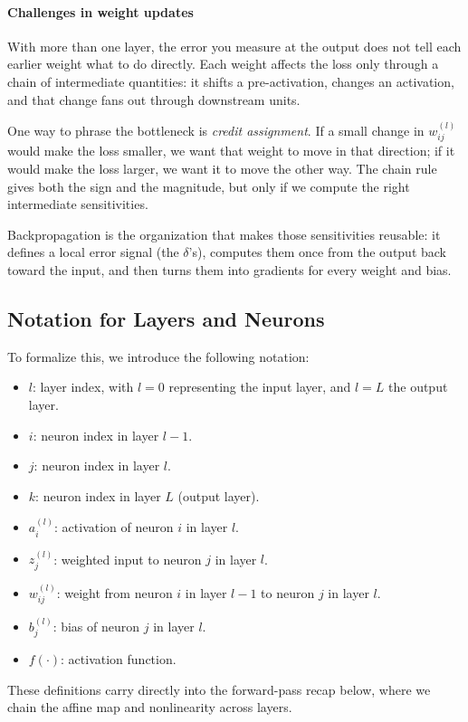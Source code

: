 \paragraph{Challenges in weight updates}
\label{sec:backprop_challenges_in_weight_updates}

With more than one layer, the error you measure at the output does not tell each earlier weight what to do directly. Each weight affects the loss only through a chain of intermediate quantities: it shifts a pre\hyp{}activation, changes an activation, and that change fans out through downstream units.

One way to phrase the bottleneck is \emph{credit assignment}. If a small change in \(w_{ij}^{(l)}\) would make the loss smaller, we want that weight to move in that direction; if it would make the loss larger, we want it to move the other way. The chain rule gives both the sign and the magnitude, but only if we compute the right intermediate sensitivities.

Backpropagation is the organization that makes those sensitivities reusable: it defines a local error signal (the \(\delta\)'s), computes them once from the output back toward the input, and then turns them into gradients for every weight and bias.

\subsection{Notation for Layers and Neurons}
\label{sec:backprop_notation_for_layers_and_neurons}

To formalize this, we introduce the following notation:
\begin{itemize}
    \item $l$: layer index, with $l=0$ representing the input layer, and $l=L$ the output layer.
    \item $i$: neuron index in layer $l-1$.
    \item $j$: neuron index in layer $l$.
    \item $k$: neuron index in layer $L$ (output layer).
    \item $a_i^{(l)}$: activation of neuron $i$ in layer $l$.
    \item $z_j^{(l)}$: weighted input to neuron $j$ in layer $l$.
    \item $w_{ij}^{(l)}$: weight from neuron $i$ in layer $l-1$ to neuron $j$ in layer $l$.
    \item $b_j^{(l)}$: bias of neuron $j$ in layer $l$.
    \item $f(\cdot)$: activation function.
\end{itemize}
These definitions carry directly into the forward-pass recap below, where we chain the affine map and nonlinearity across layers.
